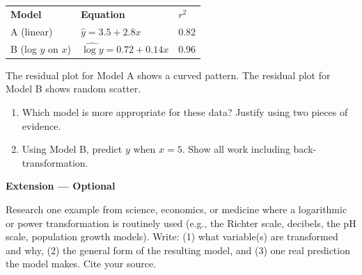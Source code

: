 \documentclass[10pt]{article}
\begin{document}
\vspace{8pt}
\renewcommand{\arraystretch}{1.4}
\begin{tabularx}{\linewidth}{@{} l X X @{}}
\rowcolor{sky} \textbf{Model} & \textbf{Equation} & \textbf{$r^2$} \\
A (linear) & $\hat{y} = 3.5 + 2.8x$ & 0.82 \\
B (log $y$ on $x$) & $\widehat{\log y} = 0.72 + 0.14x$ & 0.96 \\
\end{tabularx}

\vspace{10pt}
The residual plot for Model A shows a curved pattern. The residual plot for Model B shows
random scatter.

\begin{enumerate}[label=\textbf{(\alph*)}, leftmargin=2em, itemsep=0.18in]

  \item Which model is more appropriate for these data? Justify using two pieces of evidence.\\[8pt]

  \item Using Model B, predict $y$ when $x = 5$. Show all work including back-transformation.\\[8pt]

\end{enumerate}

\vspace{0.18in}

\begin{extensionbox}
\small\textbf{Extension --- Optional}

Research one example from science, economics, or medicine where a logarithmic or power
transformation is routinely used (e.g., the Richter scale, decibels, the pH scale,
population growth models). Write: (1) what variable(s) are transformed and why, (2) the
general form of the resulting model, and (3) one real prediction the model makes. Cite
your source.
\end{extensionbox}
\end{document}
